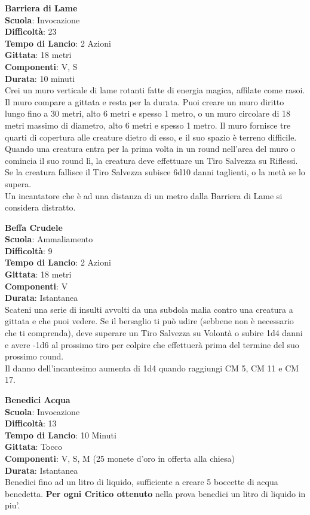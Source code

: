\begin{multicols}{2}
\medskip\textbf{Barriera di Lame}\\
\textbf{Scuola}: Invocazione\\
\textbf{Difficoltà}: 23\\
\textbf{Tempo di Lancio}: 2 Azioni\\
\textbf{Gittata}: 18 metri\\
\textbf{Componenti}: V, S\\
\textbf{Durata}: 10 minuti \\
Crei un muro verticale di lame rotanti fatte di energia magica, affilate come rasoi. Il muro compare a gittata e resta per la durata. Puoi creare un muro diritto lungo fino a 30 metri, alto 6 metri e spesso 1 metro, o un muro circolare di 18 metri massimo di diametro, alto 6 metri e spesso 1 metro. Il muro fornisce tre quarti di copertura alle creature dietro di esso, e il suo spazio è terreno difficile. \\
Quando una creatura entra per la prima volta in un round nell'area del muro o comincia il suo round lì, la creatura deve effettuare un Tiro Salvezza su Riflessi. Se la creatura fallisce il Tiro Salvezza subisce 6d10 danni taglienti, o la metà se lo supera.\\
Un incantatore che è ad una distanza di un metro dalla Barriera di Lame si considera distratto.

\medskip\textbf{Beffa Crudele}\\
\textbf{Scuola}: Ammaliamento\\
\textbf{Difficoltà}: 9\\
\textbf{Tempo di Lancio}: 2 Azioni\\
\textbf{Gittata}: 18 metri\\
\textbf{Componenti}: V\\
\textbf{Durata}: Istantanea\\
Scateni una serie di insulti avvolti da una subdola malia contro una creatura a gittata e che puoi vedere. Se il bersaglio ti può udire (sebbene non è necessario che ti comprenda), deve superare un Tiro Salvezza su Volontà o subire 1d4 danni e avere -1d6 al prossimo tiro per colpire che effettuerà prima del termine del suo prossimo round.\\
Il danno dell'incantesimo aumenta di 1d4 quando raggiungi CM 5, CM 11 e CM 17.

\medskip\textbf{Benedici Acqua}\\
\textbf{Scuola}: Invocazione\\
\textbf{Difficoltà}: 13\\
\textbf{Tempo di Lancio}: 10 Minuti\\
\textbf{Gittata}: Tocco\\
\textbf{Componenti}: V, S, M (25 monete d'oro in offerta alla chiesa)\\
\textbf{Durata}: Istantanea\\
Benedici fino ad un litro di liquido, sufficiente a creare 5 boccette di acqua benedetta.
\textbf{Per ogni Critico ottenuto} nella prova benedici un litro di liquido in piu'.\\


\end{multicols}
